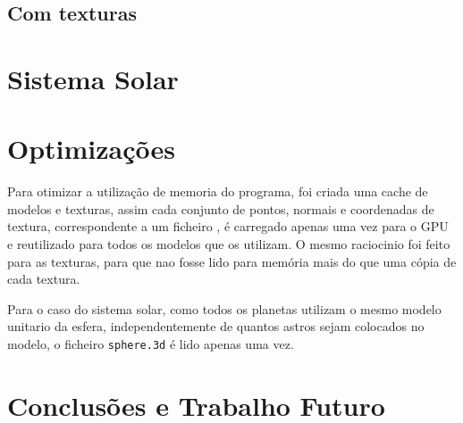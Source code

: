 \documentclass[a4paper]{article}
\begin{document}
\subsection{Com texturas}

\section{Sistema Solar}

\section{Optimizações}
Para otimizar a utilização de memoria do programa, foi criada uma cache de modelos e texturas, assim cada conjunto de pontos, normais e coordenadas de textura, correspondente a um ficheiro , é carregado apenas uma vez para o GPU e reutilizado para todos os modelos que os utilizam. O mesmo raciocinio foi feito para as texturas, para que nao fosse lido para memória mais do que uma cópia de cada textura.

Para o caso do sistema solar, como todos os planetas utilizam o mesmo modelo unitario da esfera, independentemente de quantos astros sejam colocados no modelo, o ficheiro \texttt{sphere.3d} é lido apenas uma vez.

\section{Conclusões e Trabalho Futuro}
\end{document}
